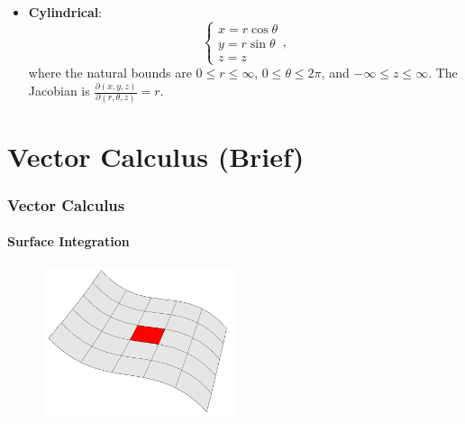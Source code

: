 \documentclass[12pt]{article}
\begin{document}
{\begin{itemize}
    Also note that $x^2 + y^2 + z^2 = \rho^2$, a helpful fact for some integrals.

    \item \textbf{Cylindrical}: \[\begin{cases}
        x = r\cos\theta\\
        y = r\sin\theta\\
        z = z
    \end{cases},\] where the natural bounds are $0 \leq r \leq \infty$, $0 \leq \theta \leq 2\pi$, and $-\infty \leq z \leq \infty$. The Jacobian is $\frac{\partial(x,y,z)}{\partial(r, \theta, z)} = r$.
\end{itemize}

\part{Vector Calculus (Brief)}
\section{Vector Calculus}
\subsection{Surface Integration}
\begin{figure}[!ht]
    \centering
    \includegraphics[width=0.5\textwidth]{misc/surface.png}
\end{figure}
}
\end{document}

